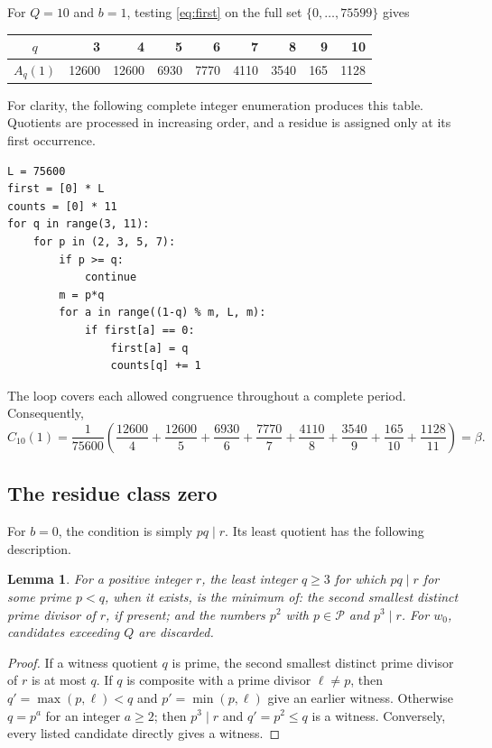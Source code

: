 \documentclass[11pt]{article}
\newtheorem{lemma}[theorem]{Lemma}
\newcommand{\PP}{\mathcal P}
\begin{document}
For $Q=10$ and $b=1$, testing \eqref{eq:first} on the full set
$\{0,\ldots,75599\}$ gives
\begin{center}
\begin{tabular}{c*{8}{r}}
\toprule
$q$ &3&4&5&6&7&8&9&10\\
\midrule
$A_q(1)$ &12600&12600&6930&7770&4110&3540&165&1128\\
\bottomrule
\end{tabular}
\end{center}
For clarity, the following complete integer enumeration produces this
table. Quotients are processed in increasing order, and a residue is
assigned only at its first occurrence.
\begin{verbatim}
L = 75600
first = [0] * L
counts = [0] * 11
for q in range(3, 11):
    for p in (2, 3, 5, 7):
        if p >= q:
            continue
        m = p*q
        for a in range((1-q) % m, L, m):
            if first[a] == 0:
                first[a] = q
                counts[q] += 1
\end{verbatim}
The loop covers each allowed congruence throughout a complete period.
Consequently,
\begin{equation}\label{eq:beta}
 C_{10}(1)=\frac1{75600}\left(
 \frac{12600}4+\frac{12600}5+\frac{6930}6+\frac{7770}7+
 \frac{4110}8+\frac{3540}9+\frac{165}{10}+\frac{1128}{11}
 \right)=\beta.
\end{equation}

\subsection{The residue class zero}

For $b=0$, the condition is simply $pq\mid r$. Its least quotient
has the following description.

\begin{lemma}\label{lem:firstzero}
For a positive integer $r$, the least integer $q\ge3$ for which
$pq\mid r$ for some prime $p<q$, when it exists, is the minimum of:
the second smallest distinct prime divisor of $r$, if present; and
the numbers $p^2$ with $p\in\PP$ and $p^3\mid r$.
For $w_0$, candidates exceeding $Q$ are discarded.
\end{lemma}
\begin{proof}
If a witness quotient $q$ is prime, the second smallest distinct prime
divisor of $r$ is at most $q$. If $q$ is composite with a prime divisor
$\ell\ne p$, then $q'=\max(p,\ell)<q$ and $p'=\min(p,\ell)$
give an earlier witness. Otherwise $q=p^a$ for an integer $a\ge2$;
then $p^3\mid r$ and $q'=p^2\le q$ is a witness. Conversely, every
listed candidate directly gives a witness.
\end{proof}
\end{document}
